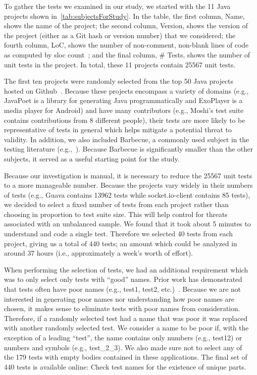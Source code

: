 To gather the tests we examined in our study, we started with the 11 Java projects shown in~\cref{tab:subjectsForStudy}.
%
In the table, the first column, Name, shows the name of the project; the second column, Version, shows the version of the project (either as a Git hash or version number) that we considered; the fourth column, LoC, shows the number of non-comment, non-blank lines of code as computed by sloc count~\cite{nguyen2007sloc}; and the final column, \# Tests, shows the number of unit tests in the project. In total, these 11 projects contain \num{25567} unit tests.

The first ten projects were randomly selected from the top \num{50} Java projects hosted on Github~\cite{top50projects}.
%
Because these projects encompass a variety of domains (e.g., JavaPoet is a library for generating Java programmatically and ExoPlayer is a media player for Android) and have many contributors (e.g., Moshi’s test suite contains contributions from \num{8} different people), their tests are more likely to be representative of tests in general which helps mitigate a potential threat to validity.
%
In addition, we also included Barbecue, a commonly used subject in the testing literature (e.g.,~\cite{zhang2015automatically, zhang2016towards,wu2020pattern}).
%
Because Barbecue is significantly smaller than the other subjects, it served as a useful starting point for the study.

Because our investigation is manual, it is necessary to reduce the \num{25567} unit tests to a more manageable number.
%
Because the projects vary widely in their numbers of tests (e.g., Guava contains \num{13962} tests while socket.io-client contains \num{85} tests), we decided to select a fixed number of tests from each project rather than choosing in proportion to test suite size.
%
This will help control for threats associated with an unbalanced sample.
%
We found that it took about \num{5} minutes to understand and code a single test.
%
Therefore we selected 40 tests from each project, giving us a total of \num{440} tests; an amount which could be analyzed in around \num{37} hours (i.e., approximately a week’s worth of effort).

When performing the selection of tests, we had an additional requirement which was to only select only tests with \enquote{good} names.
%
Prior work has demonstrated that tests often have poor names (e.g., test1, test2, etc.)~\cite{zhang2016towards}.
%
Because we are not interested in generating poor names nor understanding how poor names are chosen, it makes sense to eliminate tests with poor names from consideration.
%
Therefore, if a randomly selected test had a name that was poor it was replaced with another randomly selected test.
%
We consider a name to be poor if, with the exception of a leading \enquote{test}, the name contains only numbers (e.g., test12) or numbers and symbols (e.g., test\_2\_3).
%
We also made sure not to select any of the \num{179} tests with empty bodies contained in these applications.
%
The final set of \num{440} tests is available online: Check test names for the existence of unique parts.

